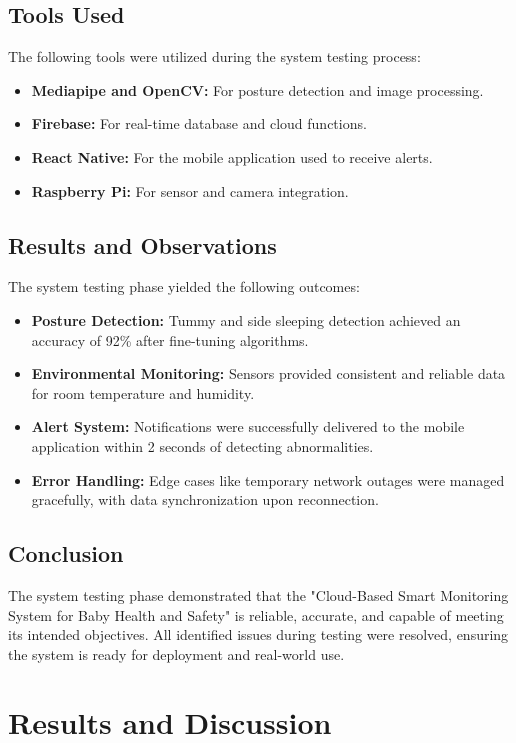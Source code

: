 \documentclass[12pt,a4paper]{report}
\begin{document}
\section{Tools Used}
The following tools were utilized during the system testing process:
\begin{itemize}
    \item \textbf{Mediapipe and OpenCV:} For posture detection and image processing.
    \item \textbf{Firebase:} For real-time database and cloud functions.
    \item \textbf{React Native:} For the mobile application used to receive alerts.
    \item \textbf{Raspberry Pi:} For sensor and camera integration.
\end{itemize}

\section{Results and Observations}
The system testing phase yielded the following outcomes:
\begin{itemize}
    \item \textbf{Posture Detection:} Tummy and side sleeping detection achieved an accuracy of 92\% after fine-tuning algorithms.
    \item \textbf{Environmental Monitoring:} Sensors provided consistent and reliable data for room temperature and humidity.
    \item \textbf{Alert System:} Notifications were successfully delivered to the mobile application within 2 seconds of detecting abnormalities.
    \item \textbf{Error Handling:} Edge cases like temporary network outages were managed gracefully, with data synchronization upon reconnection.
\end{itemize}

\section{Conclusion}
The system testing phase demonstrated that the "Cloud-Based Smart Monitoring System for Baby Health and Safety" is reliable, accurate, and capable of meeting its intended objectives. All identified issues during testing were resolved, ensuring the system is ready for deployment and real-world use.


\chapter{Results and Discussion}
\end{document}
